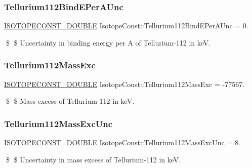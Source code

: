 \subsubsection{\texorpdfstring{Tellurium112\+Bind\+E\+Per\+A\+Unc}{Tellurium112BindEPerAUnc}}
{\footnotesize\ttfamily \mbox{\hyperlink{group___isotope_const-_macros_ga8f45a7272ce02c0b4c65c44636ed719a}{I\+S\+O\+T\+O\+P\+E\+C\+O\+N\+S\+T\+\_\+\+D\+O\+U\+B\+LE}} Isotope\+Const\+::\+Tellurium112\+Bind\+E\+Per\+A\+Unc = 0.}

\$ \$ Uncertainty in binding energy per A of Tellurium-\/112 in keV. \mbox{\label{group___isotope_const-_tellurium-_te112_gaab869676cf43af198120ce09f91168b5}} 
\subsubsection{\texorpdfstring{Tellurium112\+Mass\+Exc}{Tellurium112MassExc}}
{\footnotesize\ttfamily \mbox{\hyperlink{group___isotope_const-_macros_ga8f45a7272ce02c0b4c65c44636ed719a}{I\+S\+O\+T\+O\+P\+E\+C\+O\+N\+S\+T\+\_\+\+D\+O\+U\+B\+LE}} Isotope\+Const\+::\+Tellurium112\+Mass\+Exc = -\/77567.}

\$ \$ Mass excess of Tellurium-\/112 in keV. \mbox{\label{group___isotope_const-_tellurium-_te112_gaada302147b3c5015c7b20c9bf11f8c47}} 
\subsubsection{\texorpdfstring{Tellurium112\+Mass\+Exc\+Unc}{Tellurium112MassExcUnc}}
{\footnotesize\ttfamily \mbox{\hyperlink{group___isotope_const-_macros_ga8f45a7272ce02c0b4c65c44636ed719a}{I\+S\+O\+T\+O\+P\+E\+C\+O\+N\+S\+T\+\_\+\+D\+O\+U\+B\+LE}} Isotope\+Const\+::\+Tellurium112\+Mass\+Exc\+Unc = 8.}

\$ \$ Uncertainty in mass excess of Tellurium-\/112 in keV. \mbox{\label{group___isotope_const-_tellurium-_te112_ga7ac9b495809ea6527f44acc67eeead40}} 

